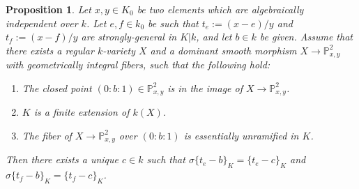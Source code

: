 \documentclass[11pt]{amsart}
\newtheorem{proposition}{Proposition}[section]
\theoremstyle{definition}
\theoremstyle{remark}
\numberwithin{equation}{section}
\newcommand{\Pbb}{\mathbb{P}}
\begin{document}
\begin{proposition}
\label{proposition: mainproof / K0 / independence-proposition}
  Let $x,y \in K_0$ be two elements which are algebraically independent over $k$.
  Let $e,f \in k_0$ be such that $t_e := (x-e)/y$ and $t_f := (x-f)/y$ are strongly-general in $K|k$, and let $b \in k$ be given.
  Assume that there exists a regular $k$-variety $X$ and a dominant smooth morphism $X \rightarrow \Pbb^2_{x,y}$ with geometrically integral fibers, such that the following hold:
  \begin{enumerate}
    \item The closed point $(0:b:1) \in \Pbb^2_{x,y}$ is in the image of $X \rightarrow \Pbb^2_{x,y}$.
    \item $K$ is a finite extension of $k(X)$.
    \item The fiber of $X \rightarrow \Pbb^2_{x,y}$ over $(0:b:1)$ is essentially unramified in $K$.
  \end{enumerate}
  Then there exists a unique $c \in k$ such that $\sigma\{t_e-b\}_K = \{t_e-c\}_K$ and $\sigma\{t_f-b\}_K = \{t_f-c\}_K$.
\end{proposition}
\end{document}
